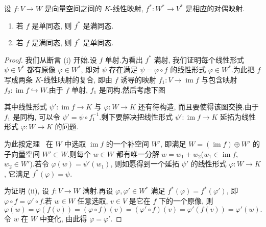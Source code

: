 \begin{theorem}\label{thm:2.3.3}
设 $f \colon V \longrightarrow W$ 是向量空间之间的 $K$-线性映射, $f^* \colon W^* \longrightarrow V^*$ 是相应的对偶映射.
\begin{enumerate}
\item[(i)] 若 $f$ 是单同态, 则 $f^*$ 是满同态.
\item[(ii)] 若 $f$ 是满同态, 则 $f^*$ 是单同态.
\end{enumerate}
\end{theorem}

\begin{proof}
我们从断言 (i) 开始.设 $f$ 单射.为看出 $f^*$ 满射, 我们证明每个线性形式 $\psi \in V^*$ 都有原像 $\varphi \in W^*$, 即对 $\psi$ 存在满足 $\psi = \varphi \circ f$ 的线性形式 $\varphi \in W^*$.为此把 $f$ 写成两条 $K$-线性映射的复合, 即由 $f$ 诱导的映射 $f_1 \colon V \longrightarrow \operatorname{im} f$ 与包含映射 $f_2 \colon \operatorname{im} f \hookrightarrow W$.由于 $f$ 单射, $f_1$ 是同构.然后考虑下图
\begin{center}
\end{center}
其中线性形式 $\psi' \colon \operatorname{im} f \longrightarrow K$ 与 $\varphi \colon W \longrightarrow K$ 还有待构造, 而且要使得该图交换.由于 $f_1$ 是同构, 可以令 $\psi' = \psi \circ f_1^{-1}$.剩下要解决把线性形式 $\psi' \colon \operatorname{im} f \longrightarrow K$ 延拓为线性形式 $\varphi \colon W \longrightarrow K$ 的问题.

为此按定理~ 在 $W$ 中选取 $\operatorname{im} f$ 的一个补空间 $W'$, 即满足 $W = (\operatorname{im} f) \oplus W'$ 的子向量空间 $W' \subset W$.则每个 $w \in W$ 都有唯一分解 $w = w_1 + w_2$($w_1 \in \operatorname{im} f$, $w_2 \in W'$).若令 $\varphi(w) = \psi'(w_1)$, 则如愿得到一个延拓 $\psi'$ 的线性形式 $\varphi \colon W \longrightarrow K$, 它满足 $f^*(\varphi) = \psi$.

为证明 (ii), 设 $f \colon V \longrightarrow W$ 满射.再设 $\varphi, \varphi' \in W^*$ 满足 $f^*(\varphi) = f^*(\varphi')$, 即 $\varphi \circ f = \varphi' \circ f$.若 $w \in W$ 任意选取, $v \in V$ 是它在 $f$ 下的一个原像, 则
\[
\varphi(w) = \varphi(f(v)) = (\varphi \circ f)(v) = (\varphi' \circ f)(v) = \varphi'(f(v)) = \varphi'(w)\text{.}
\]
令 $w$ 在 $W$ 中变化, 由此得 $\varphi = \varphi'$.
\end{proof}

